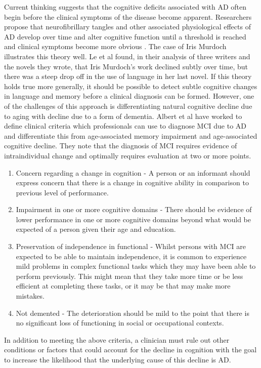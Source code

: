 \documentclass[12pt, twoside, a4paper]{article}
\begin{document}
\par
Current thinking suggests that the cognitive deficits associated with AD often begin before the clinical symptoms of the disease become apparent. Researchers propose that neurofibrillary tangles and other associated physiological effects of AD develop over time and alter cognitive function until a threshold is reached and clinical symptoms become more obvious \cite{Nestor2006}. The case of Iris Murdoch illustrates this theory well. Le et al \cite{Le2012}found, in their analysis of three writers and the novels they wrote, that Iris Murdoch's work declined subtly over time, but there was a steep drop off in the use of language in her last novel. If this theory holds true more generally, it should be possible to detect subtle cognitive changes in language and memory before a clinical diagnosis can be formed. However, one of the challenges of this approach is differentiating natural cognitive decline due to aging with decline due to a form of dementia. Albert et al have worked to define clinical criteria which professionals can use to diagnose MCI due to AD and differentiate this from age-associated memory impairment and age-associated cognitive decline. They note that the diagnosis of MCI requires evidence of intraindividual change and optimally requires evaluation at two or more points.
\begin{enumerate}
	\item Concern regarding a change in cognition - A person or an informant should express concern that there is a change in cognitive ability in comparison to previous level of performance.
	\item Impairment in one or more cognitive domains - There should be evidence of lower performance in one or more cognitive domains beyond what would be expected of a person given their age and education. 
	\item Preservation of independence in functional - Whilst persons with MCI are expected to be able to maintain independence, it is common to experience mild problems in complex functional tasks which they may have been able to perform previously. This might mean that they take more time or be less efficient at completing these tasks, or it may be that may make more mistakes.
	\item Not demented - The deterioration should be mild to the point that there is no significant loss of functioning in social or occupational contexts.
\end{enumerate}
In addition to meeting the above criteria, a clinician must rule out other conditions or factors that could account for the decline in cognition with the goal to increase the likelihood that the underlying cause of this decline is AD. 
\end{document}
